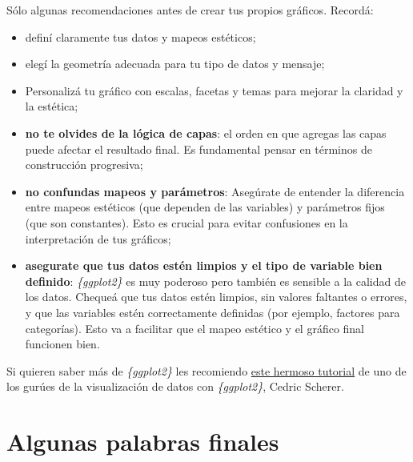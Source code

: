 \documentclass[
  letterpaper,
  DIV=11,
  numbers=noendperiod,
  oneside]{scrreprt}
\providecommand{\tightlist}{%
  \setlength{\itemsep}{0pt}\setlength{\parskip}{0pt}}\usepackage{longtable,booktabs,array}
\begin{document}
Sólo algunas recomendaciones antes de crear tus propios gráficos.
Recordá:

\begin{itemize}
\tightlist
\item
  definí claramente tus datos y mapeos estéticos;
\item
  elegí la geometría adecuada para tu tipo de datos y mensaje;
\item
  Personalizá tu gráfico con escalas, facetas y temas para mejorar la
  claridad y la estética;
\item
  \textbf{no te olvides de la lógica de capas}: el orden en que agregas
  las capas puede afectar el resultado final. Es fundamental pensar en
  términos de construcción progresiva;
\item
  \textbf{no confundas mapeos y parámetros}: Asegúrate de entender la
  diferencia entre mapeos estéticos (que dependen de las variables) y
  parámetros fijos (que son constantes). Esto es crucial para evitar
  confusiones en la interpretación de tus gráficos;
\item
  \textbf{asegurate que tus datos estén limpios y el tipo de variable
  bien definido}: \emph{\{ggplot2\}} es muy poderoso pero también es
  sensible a la calidad de los datos. Chequeá que tus datos estén
  limpios, sin valores faltantes o errores, y que las variables estén
  correctamente definidas (por ejemplo, factores para categorías). Esto
  va a facilitar que el mapeo estético y el gráfico final funcionen
  bien.
\end{itemize}

Si quieren saber más de \emph{\{ggplot2\}} les recomiendo
\href{https://www.cedricscherer.com/2019/08/05/a-ggplot2-tutorial-for-beautiful-plotting-in-r/}{este
hermoso tutorial} de uno de los gurúes de la visualización de datos con
\emph{\{ggplot2\}}, Cedric Scherer.

\hypertarget{algunas-palabras-finales}{%
\section{Algunas palabras finales}\label{algunas-palabras-finales}}
\end{document}

